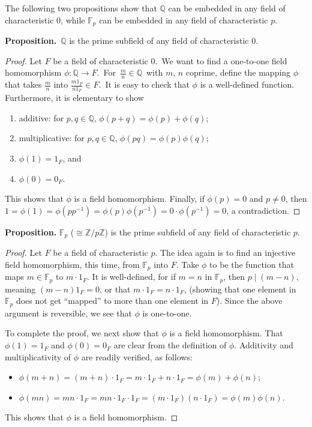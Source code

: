 \documentclass[12pt]{article}
\newcommand{\fp}{\mathbb{F}_p}
\newcommand{\rat}{\mathbb{Q}}
\begin{document}
The following two propositions show that $\rat$ can be embedded in any field of characteristic $0$, while $\fp$ can be embedded in any field of characteristic $p$.

\textbf{Proposition.}\, $\rat$ is the prime subfield of any field of characteristic 0.  
\begin{proof}  Let $F$ be a field of characteristic $0$.\, We want to find a one-to-one field homomorphism $\phi:\rat\to F$.\, For\, $\frac{m}{n}\in\mathbb{Q}$\, with $m,\,n$ coprime, define the mapping $\phi$ that takes $\frac{m}{n}$ into $\frac{m1_F}{n1_F}\in F$.\, It is easy to check that $\phi$ is a well-defined function.\, Furthermore, it is elementary to show   
\begin{enumerate}
\item additive: for $p,q\in\rat$, $\phi(p+q)=\phi(p)+\phi(q)$;
\item multiplicative: for $p,q\in\rat$, $\phi(pq)=\phi(p)\phi(q)$;
\item $\phi(1)=1_F$, and
\item $\phi(0)=0_F$.
\end{enumerate}
This shows that $\phi$ is a field homomorphism.  Finally, if $\phi(p)=0$ and $p\ne 0$, then $1=\phi(1)=\phi(pp^{-1})=\phi(p)\phi(p^{-1})=0\cdot\phi(p^{-1})=0$, a contradiction.
\end{proof}

\textbf{Proposition.}  $\fp$ ($\cong\mathbb{Z}/p\mathbb{Z}$) is the prime subfield of any field of characteristic $p$.
\begin{proof}  Let $F$ be a field of characteristic $p$.  The idea again is to find an injective field homomorphism, this time, from $\fp$ into $F$.  Take $\phi$ to be the function that maps $m\in \fp$ to $m\cdot 1_F$.  It is well-defined, for if $m=n$ in $\fp$, then $p\mid (m-n)$, meaning $(m-n)1_F=0$, or that $m\cdot 1_F=n\cdot 1_F$, (showing that one element in $\fp$ does not get ``mapped'' to more than one element in $F$).  Since the above argument is reversible, we see that $\phi$ is one-to-one.

To complete the proof, we next show that $\phi$ is a field homomorphism.  That $\phi(1)=1_F$ and $\phi(0)=0_F$ are clear from the definition of $\phi$.  Additivity and multiplicativity of $\phi$ are readily verified, as follows: 
\begin{itemize}
\item $\phi(m+n)=(m+n)\cdot 1_F=m\cdot 1_F + n\cdot 1_F=\phi(m)+\phi(n)$; 
\item $\phi(mn)=mn\cdot 1_F=mn\cdot 1_F\cdot 1_F=(m\cdot 1_F)(n\cdot 1_F)=\phi(m)\phi(n)$.  
\end{itemize}
This shows that $\phi$ is a field homomorphism.
\end{proof}
\end{document}
